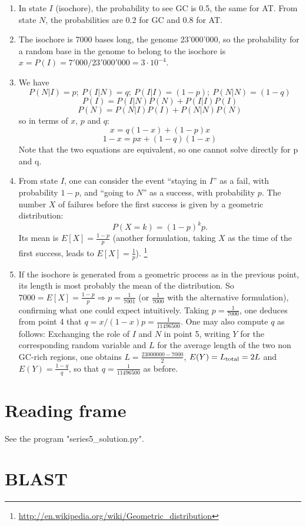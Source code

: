 \documentclass[a4paper,11pt]{article}
\begin{document}
\begin{enumerate}
\item In state $I$ (isochore), the probability to see GC is 0.5, the same for AT. From state $N$, the probabilities are 0.2 for GC and 0.8 for AT.
\item The isochore is 7000 bases long, the genome 23'000'000, so the probability for a random base in the genome to belong to the isochore is $x = P(I) = 7'000/23'000'000 = 3\cdot 10^{-4}$.
\item We have
$$ P(N|I)=p; \ P(I|N)=q; \ P(I|I)=(1-p); \ P(N|N)=(1-q)$$
$$ P(I) = P(I|N)P(N) + P(I|I)P(I) $$
$$ P(N) = P(N|I)P(I) + P(N|N)P(N) $$
so in terms of $x$, $p$ and $q$:
$$ x = q(1-x) + (1-p)x $$
$$ 1-x = px + (1-q)(1-x) $$
Note that the two equations are equivalent, so one cannot solve directly for p and q.
\item From state $I$, one can consider the event ``staying in $I$'' as a fail, with probability $1-p$, and ``going to $N$'' as a success, with probability $p$. The number $X$ of failures before the first success is given by a geometric distribution:
$$ P(X=k) = (1-p)^k p .$$
Its mean is $E[X] = \frac{1-p}{p}$ (another formulation, taking $X$ as the time of the first success, leads to $E[X] = \frac{1}{p}$).
\footnote{\url{http://en.wikipedia.org/wiki/Geometric_distribution}}
\item If the isochore is generated from a geometric process as in the previous point, its length is most probably the mean of the distribution. So $7000 = E[X] = \frac{1-p}{p} \Rightarrow p = \frac{1}{7001}$ (or $\frac{1}{7000}$ with the alternative formulation), confirming what one could expect intuitively. Taking $p=\frac{1}{7000}$, one deduces from point 4 that $q = x/(1-x) p = \frac{1}{11496500}$. One may also compute $q$ as follows: Exchanging the role of $I$ and $N$ in point 5, writing $Y$ for the corresponding random variable and $L$ for the average length of the two non GC-rich regions, one obtains $L= \frac{23000000-7000}{2}$, $E(Y)=L_{\rm total}=2L$ and $E(Y) =  \frac{1-q}{q}$, so that $q = \frac{1}{11496500}$ as before.
\end{enumerate}

\section{Reading frame}

See the program "series5\_solution.py".

\section{BLAST}
\end{document}
